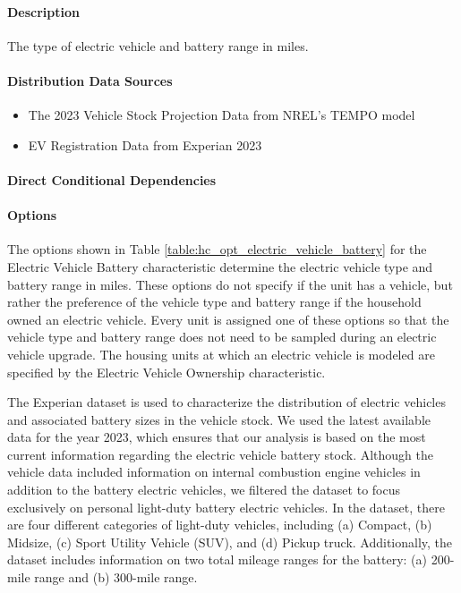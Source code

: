 \paragraph{Description}
% 
The type of electric vehicle and battery range in miles.

\paragraph{Distribution Data Sources}
% 
\begin{itemize}
  \item The 2023 Vehicle Stock Projection Data from NREL's TEMPO model
  \item EV Registration Data from Experian 2023
\end{itemize}

\paragraph{Direct Conditional Dependencies}


\paragraph{Options}
The options shown in Table \ref{table:hc_opt_electric_vehicle_battery} for the Electric Vehicle Battery characteristic determine the electric vehicle type and battery range in miles. These options do not specify if the unit has a vehicle, but rather the preference of the vehicle type and battery range if the household owned an electric vehicle. Every unit is assigned one of these options so that the vehicle type and battery range does not need to be sampled during an electric vehicle upgrade. The housing units at which an electric vehicle is modeled are specified by the Electric Vehicle Ownership characteristic.



The Experian dataset is used to characterize the distribution of electric vehicles and associated battery sizes in the vehicle stock. We used the latest available data for the year 2023, which ensures that our analysis is based on the most current information regarding the electric vehicle battery stock. Although the vehicle data included information on internal combustion engine vehicles in addition to the battery electric vehicles, we filtered the dataset to focus exclusively on personal light-duty battery electric vehicles. In the dataset, there are four different categories of light-duty vehicles, including (a) Compact, (b) Midsize, (c) Sport Utility Vehicle (SUV), and (d) Pickup truck. Additionally, the dataset includes information on two total mileage ranges for the battery: (a) 200-mile range and (b) 300-mile range.


